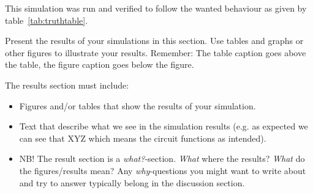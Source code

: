 This simulation was run and verified to follow the wanted behaviour as given by table~\ref{tab:truthtable}.

Present the results of your simulations in this section. Use tables and graphs or other figures to illustrate your results. Remember: The table caption goes above the table, the figure caption goes below the figure.

The results section must include:
\begin{itemize}
    \item Figures and/or tables that show the results of your simulation.
    \item Text that describe what we see in the simulation results (e.g. as expected we can see that XYZ which means the circuit functions as intended).
    \item NB! The result section is a \textit{what?}-section. \textit{What} where the results? \textit{What} do the figures/results mean? Any \textit{why}-questions you might want to write about and try to answer typically belong in the discussion section.
\end{itemize}